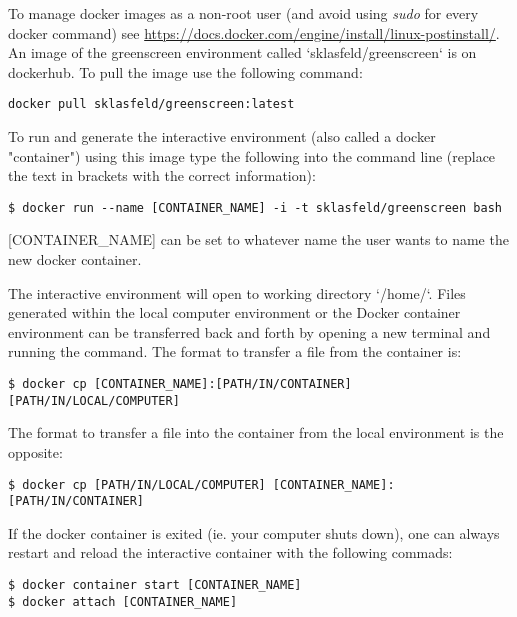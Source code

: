 \documentclass{article}
\begin{document}
\begin{sloppypar}
To manage docker images as a non-root user (and avoid using \emph{sudo} for every docker command) see \url{https://docs.docker.com/engine/install/linux-postinstall/}. An image of the greenscreen environment called `sklasfeld/greenscreen` is on dockerhub. To pull the image use the following command:

\begin{verbatim}
docker pull sklasfeld/greenscreen:latest
\end{verbatim}

To run and generate the interactive environment (also called a docker "container") using this image type the following into the command line (replace the text in brackets with the correct information):

\begin{verbatim}
$ docker run --name [CONTAINER_NAME] -i -t sklasfeld/greenscreen bash
\end{verbatim}

[CONTAINER\_NAME] can be set to whatever name the user wants to name the new docker container.

The interactive environment will open to working directory `/home/`. Files generated within the local computer environment or the Docker container environment can be transferred back and forth by opening a new terminal and running the  command. The format to transfer a file from the container is:

\begin{verbatim}
$ docker cp [CONTAINER_NAME]:[PATH/IN/CONTAINER] [PATH/IN/LOCAL/COMPUTER]
\end{verbatim}

The format to transfer a file into the container from the local environment is the opposite:

\begin{verbatim}
$ docker cp [PATH/IN/LOCAL/COMPUTER] [CONTAINER_NAME]:[PATH/IN/CONTAINER] 
\end{verbatim}

If the docker container is exited (ie. your computer shuts down), one can always restart and reload the interactive container with the following commads:

\begin{verbatim}
$ docker container start [CONTAINER_NAME]
$ docker attach [CONTAINER_NAME] 
\end{verbatim}


\end{sloppypar}
\end{document}
